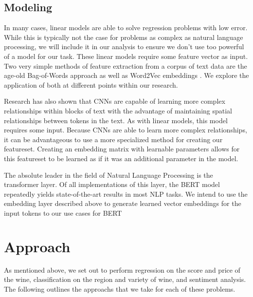 \documentclass[10pt]{IEEEtran}
\begin{document}
\subsection{Modeling}
    In many cases, linear models are able to solve regression problems with low error. While this is typically not the case for problems as complex as natural language processing, we will include it in our analysis to ensure we don't use too powerful of a model for our task. These linear models require some feature vector as input. Two very simple methods of feature extraction from a corpus of text data are the age-old Bag-of-Words approach\cite{bag_of_words} as well as Word2Vec embeddings \cite{word2vec}. We explore the application of both at different points within our research.\par
    Research has also shown that CNNs are capable of learning more complex relationships within blocks of text with the advantage of maintaining spatial relationships between tokens in the text\cite{cnn}. As with linear models, this model requires some input. Because CNNs are able to learn more complex relationships, it can be advantageous to use a more specialized method for creating our featureset. Creating an embedding matrix with learnable parameters allows for this featureset to be learned as if it was an additional parameter in the model.\par
    The absolute leader in the field of Natural Language Processing is the transformer layer. Of all implementations of this layer, the BERT model repeatedly yields state-of-the-art results in most NLP tasks\cite{bert}. We intend to use the embedding layer described above to generate learned vector embeddings for the input tokens to our use cases for BERT 

\section{Approach}
    As mentioned above, we set out to perform regression on the score and price of the wine, classification on the region and variety of wine, and sentiment analysis. The following outlines the approachs that we take for each of these problems.
\end{document}
